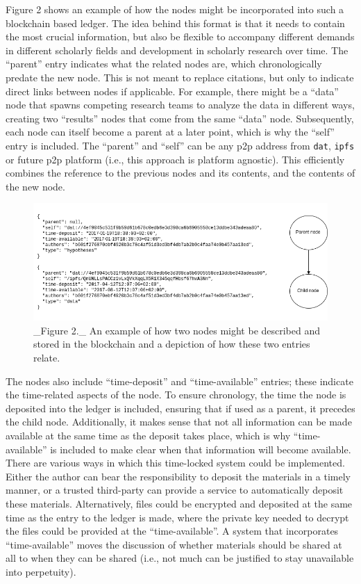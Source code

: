 \documentclass[]{tufte-book}
\begin{document}
Figure 2 shows an example of how the nodes might be incorporated into
such a blockchain based ledger. The idea behind this format is that it
needs to contain the most crucial information, but also be flexible to
accompany different demands in different scholarly fields and
development in scholarly research over time. The ``parent'' entry
indicates what the related nodes are, which chronologically predate the
new node. This is not meant to replace citations, but only to indicate
direct links between nodes if applicable. For example, there might be a
``data'' node that spawns competing research teams to analyze the data
in different ways, creating two ``results'' nodes that come from the
same ``data'' node. Subsequently, each node can itself become a parent
at a later point, which is why the ``self'' entry is included. The
``parent'' and ``self'' can be any p2p address from \texttt{dat},
\texttt{ipfs} or future p2p platform (i.e., this approach is platform
agnostic). This efficiently combines the reference to the previous nodes
and its contents, and the contents of the new node.

\begin{figure}
\includegraphics[width=1\linewidth]{figs/fig-json} \caption[_Figure 2._ An example of how two nodes might be described and stored in the blockchain and a depiction of how these two entries relate]{_Figure 2._ An example of how two nodes might be described and stored in the blockchain and a depiction of how these two entries relate.}\label{fig:fig_json}
\end{figure}

The nodes also include ``time-deposit'' and ``time-available'' entries;
these indicate the time-related aspects of the node. To ensure
chronology, the time the node is deposited into the ledger is included,
ensuring that if used as a parent, it precedes the child node.
Additionally, it makes sense that not all information can be made
available at the same time as the deposit takes place, which is why
``time-available'' is included to make clear when that information will
become available. There are various ways in which this time-locked
system could be implemented. Either the author can bear the
responsibility to deposit the materials in a timely manner, or a trusted
third-party can provide a service to automatically deposit these
materials. Alternatively, files could be encrypted and deposited at the
same time as the entry to the ledger is made, where the private key
needed to decrypt the files could be provided at the ``time-available''.
A system that incorporates ``time-available'' moves the discussion of
whether materials should be shared at all to when they can be shared
(i.e., not much can be justified to stay unavailable into perpetuity).
\end{document}
